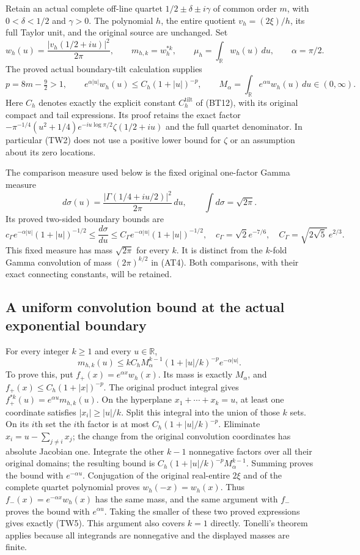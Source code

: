 \documentclass[11pt,a4paper]{article}
\begin{document}
Retain an actual complete off-line quartet
$1/2\pm\delta\pm i\gamma$ of common order $m$, with
$0<\delta<1/2$ and $\gamma>0$.  The polynomial $h$, the entire quotient
$v_h=(2\xi)/h$, its full Taylor unit, and the original source are unchanged.
Set
\[
 w_h(u)=\frac{|v_h(1/2+iu)|^2}{2\pi},\qquad
 m_{h,k}=w_h^{*k},\qquad \mu_h=\int_{\mathbb R}w_h(u)\,du,
 \qquad \alpha=\pi/2.
 \tag{TW1}
\]
The proved actual boundary-tilt calculation supplies
\[
 p=8m-\tfrac92>1,\qquad
 e^{\alpha|u|}w_h(u)\leq C_h(1+|u|)^{-p},\qquad
 M_\alpha=\int_{\mathbb R}e^{\alpha u}w_h(u)\,du\in(0,\infty).
 \tag{TW2}
\]
Here $C_h$ denotes exactly the explicit constant $C_h^{\mathrm{tilt}}$
of (BT12), with its original compact and tail expressions.
Its proof retains the exact factor
$-\pi^{-1/4}(u^2+1/4)e^{-iu\log\pi/2}\zeta(1/2+iu)$
and the full quartet denominator.  In particular (TW2) does not use a
positive lower bound for $\zeta$ or an assumption about its zero locations.

The comparison measure used below is the fixed original one-factor
Gamma measure
\[
 d\sigma(u)=\frac{|\Gamma(1/4+iu/2)|^2}{2\pi}\,du,
 \qquad \int d\sigma=\sqrt{2\pi}.
 \tag{TW3}
\]
Its proved two-sided boundary bounds are
\[
 c_\Gamma e^{-\alpha|u|}(1+|u|)^{-1/2}
 \leq\frac{d\sigma}{du}
 \leq C_\Gamma e^{-\alpha|u|}(1+|u|)^{-1/2},
 \quad
 c_\Gamma=\sqrt2e^{-7/6},\quad
 C_\Gamma=\sqrt{2\sqrt5}\,e^{2/3}.
 \tag{TW4}
\]
This fixed measure has mass $\sqrt{2\pi}$ for every $k$.  It is distinct
from the $k$-fold Gamma convolution of mass $(2\pi)^{k/2}$ in (AT4).
Both comparisons, with their exact connecting constants, will be retained.

\subsection{A uniform convolution bound at the actual exponential boundary}

For every integer $k\geq1$ and every $u\in\mathbb R$,
\[
 \boxed{m_{h,k}(u)\leq
 kC_hM_\alpha^{k-1}(1+|u|/k)^{-p}e^{-\alpha|u|}.}
 \tag{TW5}
\]
To prove this, put $f_+(x)=e^{\alpha x}w_h(x)$.  Its mass is exactly
$M_\alpha$, and $f_+(x)\leq C_h(1+|x|)^{-p}$.  The original product
integral gives $f_+^{*k}(u)=e^{\alpha u}m_{h,k}(u)$.
On the hyperplane $x_1+\cdots+x_k=u$, at least one coordinate satisfies
$|x_i|\geq|u|/k$.  Split this integral into the union of those $k$ sets.
On its $i$th set the $i$th factor is at most
$C_h(1+|u|/k)^{-p}$.  Eliminate $x_i=u-\sum_{j\ne i}x_j$; the change
from the original convolution coordinates has absolute Jacobian one.
Integrate the other $k-1$ nonnegative factors over all their original
domains; the resulting bound is
$C_h(1+|u|/k)^{-p}M_\alpha^{k-1}$.
Summing proves the bound with $e^{-\alpha u}$.
Conjugation of the original real-entire $2\xi$ and of the complete
quartet polynomial proves $w_h(-x)=w_h(x)$.  Thus
$f_-(x)=e^{-\alpha x}w_h(x)$ has the same mass, and the same argument
with $f_-$ proves the bound with $e^{\alpha u}$.  Taking the smaller
of these two proved expressions gives exactly (TW5).  This argument
also covers $k=1$ directly.  Tonelli's theorem applies because all
integrands are nonnegative and the displayed masses are finite.
\end{document}
